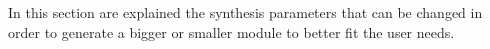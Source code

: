In this section are explained the synthesis parameters that can be changed in
order to generate a bigger or smaller module to better fit the user needs.
